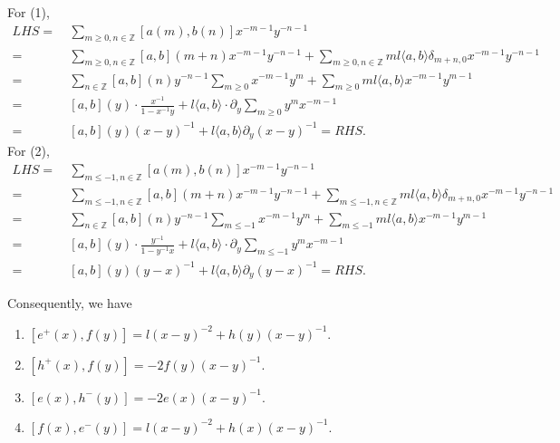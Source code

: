\documentclass{article}
\theoremstyle{definition}
\newcommand{\Z}{{\mathbb Z}}
\begin{document}
For (1), 
\begin{align*}
    LHS = \ & \sum_{m\geq 0, n\in \Z} [a(m),b(n)]x^{-m-1}y^{-n-1} \\
    = \ & \sum_{m\geq 0, n\in \Z} [a,b](m+n) x^{-m-1}y^{-n-1} + \sum_{m\geq 0, n\in \Z} m l \langle a, b\rangle \delta_{m+n, 0}x^{-m-1} y^{-n-1}\\
    = \ & \sum_{n\in \Z} [a,b](n)y^{-n-1}\sum_{m\geq 0} x^{-m-1}y^m + \sum_{m\geq 0} m l \langle a, b\rangle x^{-m-1}y^{m-1} \\
    = \ & [a,b](y) \cdot \frac{x^{-1}}{1-x^{-1}y} + l \langle a, b \rangle \cdot \partial_{y} \sum_{m\geq 0} y^m x^{-m-1} \\
    = \ & [a,b](y) (x-y)^{-1} + l\langle a, b\rangle \partial_y (x-y)^{-1} = RHS. 
\end{align*}
For (2), 
\begin{align*}
    LHS = \ & \sum_{m \leq -1, n\in \Z} [a(m),b(n)]x^{-m-1}y^{-n-1} \\
    = \ & \sum_{m \leq -1, n\in \Z} [a,b](m+n) x^{-m-1}y^{-n-1} + \sum_{m \leq -1, n\in \Z} m l \langle a, b\rangle \delta_{m+n, 0}x^{-m-1} y^{-n-1}\\
    = \ & \sum_{n\in \Z} [a,b](n)y^{-n-1}\sum_{m \leq -1} x^{-m-1}y^m + \sum_{m\leq -1} m l \langle a, b\rangle x^{-m-1}y^{m-1} \\
    = \ & [a,b](y) \cdot \frac{y^{-1}}{1-y^{-1}x} + l \langle a, b \rangle \cdot \partial_{y} \sum_{m \leq -1} y^m x^{-m-1} \\
    = \ & [a,b](y) (y-x)^{-1} + l\langle a, b\rangle \partial_y (y-x)^{-1} = RHS. 
\end{align*}

Consequently, we have
\begin{enumerate}
    \item $[e^+(x), f(y)] = l (x-y)^{-2} + h(y) (x-y)^{-1}. $
    \item $[h^+(x), f(y)] = -2f(y) (x-y)^{-1}.$
    \item $[e(x), h^-(y)] = -2e(x) (x-y)^{-1}.$
    \item $[f(x), e^-(y)] = l (x-y)^{-2} + h(x) (x-y)^{-1}.$
\end{enumerate}
\end{document}
